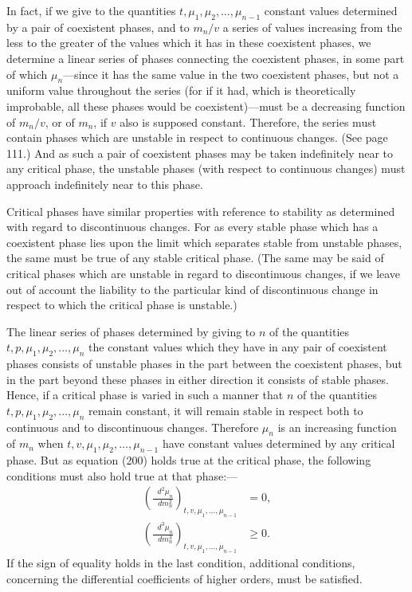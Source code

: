 \documentclass[11pt]{article}
\newcommand{\dd}{\mathop{}\!d}
\begin{document}
In fact, if we give to the quantities $t,\mu_1,\mu_2,\ldots,\mu_{n-1}$ constant values determined by a pair of coexistent phases, and to $m_n/v$ a series of values increasing from the less to the greater of the values which it has in these coexistent phases, we determine a linear series of phases connecting the coexistent phases, in some part of which $\mu_n$---since it has the same value in the two coexistent phases, but not a uniform value throughout the series (for if it had, which is theoretically improbable, all these phases would be coexistent)---must be a decreasing function of $m_n/v$, or of $m_n$, if $v$ also is supposed constant. Therefore, the series must contain phases which are unstable in respect to continuous changes. (See page 111.) And as such a pair of coexistent phases may be taken indefinitely near to any critical phase, the unstable phases (with respect to continuous changes) must approach indefinitely near to this phase.

Critical phases have similar properties with reference to stability as determined with regard to discontinuous changes. For as every stable phase which has a coexistent phase lies upon the limit which separates stable from unstable phases, the same must be true of any stable critical phase. (The same may be said of critical phases which are unstable in regard to discontinuous changes, if we leave out of account the liability to the particular kind of discontinuous change in respect to which the critical phase is unstable.)

The linear series of phases determined by giving to $n$ of the quantities $t,p,\mu_1,\mu_2,\ldots,\mu_n$ the constant values which they have in any pair of coexistent phases consists of unstable phases in the part between the coexistent phases, but in the part beyond these phases in either direction it consists of stable phases. Hence, if a critical phase is varied in such a manner that $n$ of the quantities $t,p,\mu_1,\mu_2,\ldots,\mu_n$ remain constant, it will remain stable in respect both to continuous and to discontinuous changes. Therefore $\mu_n$ is an increasing function of $m_n$ when $t,v,\mu_1,\mu_2,\ldots,\mu_{n-1}$ have constant values determined by any critical phase. But as equation (200) holds true at the critical phase, the following conditions must also hold true at that phase:---
\begin{align}
\left(\frac{\dd^2\mu_n}{\dd m_n^2}\right)_{t,v,\mu_1,
\ldots,\mu_{n-1}}&=0, \tag{201}\label{eq:gibbs-v1-p3-201}\\
\left(\frac{\dd^3\mu_n}{\dd m_n^3}\right)_{t,v,\mu_1,
\ldots,\mu_{n-1}}&\geq 0. \tag{202}\label{eq:gibbs-v1-p3-202}
\end{align}
If the sign of equality holds in the last condition, additional conditions, concerning the differential coefficients of higher orders, must be satisfied.
\end{document}
